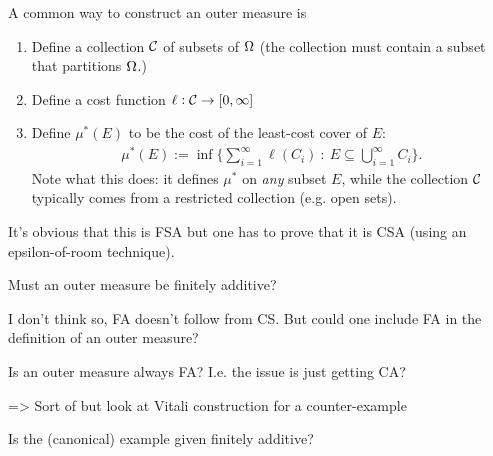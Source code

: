 A common way to construct an outer measure is
\begin{enumerate}
\item Define a collection $\mathcal C$ of subsets of $\Omega$ (the collection must contain a subset that partitions $\Omega$.)
\item Define a cost function $\ell : \mathcal C \to [0, \infty]$
\item Define $\mu^*(E)$ to be the cost of the least-cost cover of $E$:
  \begin{align*}
    \mu^*(E) := \inf \Big\{\sum_{i=1}^\infty\ell(C_i) ~:~ E \subseteq \bigcup_{i=1}^\infty C_i\Big\}.
  \end{align*}
  Note what this does: it defines $\mu^*$ on {\it any} subset $E$, while the collection $\mathcal C$ typically comes from a
  restricted collection (e.g. open sets).
\end{enumerate}

It's obvious that this is FSA but one has to prove that it is CSA (using an epsilon-of-room technique).

\begin{question*}
   Must an outer measure be finitely additive?

  I don't think so, FA doesn't follow from CS. But could one include FA in the definition of an outer measure?


Is an outer measure always FA? I.e. the issue is just getting CA?

=> Sort of but look at Vitali construction for a counter-example

  Is the (canonical) example given finitely additive?
\end{question*}

